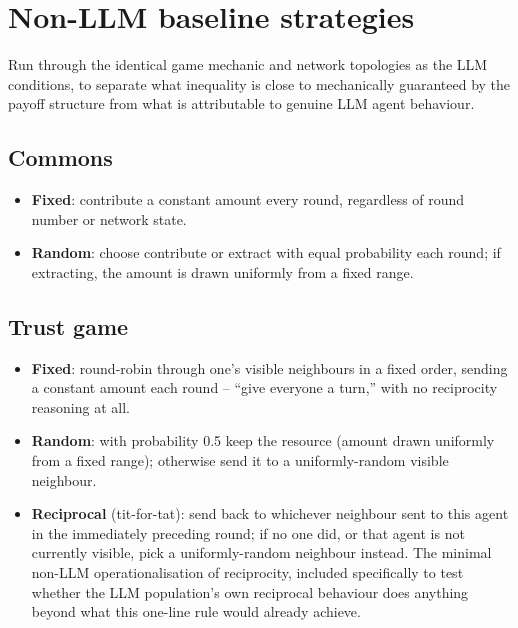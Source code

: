 \documentclass[11pt,a4paper]{article}
\begin{document}
\section{Non-LLM baseline strategies}
\label{sec:s4}

Run through the identical game mechanic and network topologies as the
LLM conditions, to separate what inequality is close to mechanically
guaranteed by the payoff structure from what is attributable to
genuine LLM agent behaviour.

\subsection{Commons}

\begin{itemize}[leftmargin=1.5em]
  \item \textbf{Fixed}: contribute a constant amount every round,
  regardless of round number or network state.
  \item \textbf{Random}: choose contribute or extract with equal
  probability each round; if extracting, the amount is drawn uniformly
  from a fixed range.
\end{itemize}

\subsection{Trust game}

\begin{itemize}[leftmargin=1.5em]
  \item \textbf{Fixed}: round-robin through one's visible neighbours
  in a fixed order, sending a constant amount each round -- ``give
  everyone a turn,'' with no reciprocity reasoning at all.
  \item \textbf{Random}: with probability 0.5 keep the resource
  (amount drawn uniformly from a fixed range); otherwise send it to a
  uniformly-random visible neighbour.
  \item \textbf{Reciprocal} (tit-for-tat): send back to whichever
  neighbour sent to this agent in the immediately preceding round; if
  no one did, or that agent is not currently visible, pick a
  uniformly-random neighbour instead. The minimal non-LLM operationalisation of
  reciprocity, included specifically to test whether the LLM
  population's own reciprocal behaviour does anything beyond what
  this one-line rule would already achieve.
\end{itemize}
\end{document}
